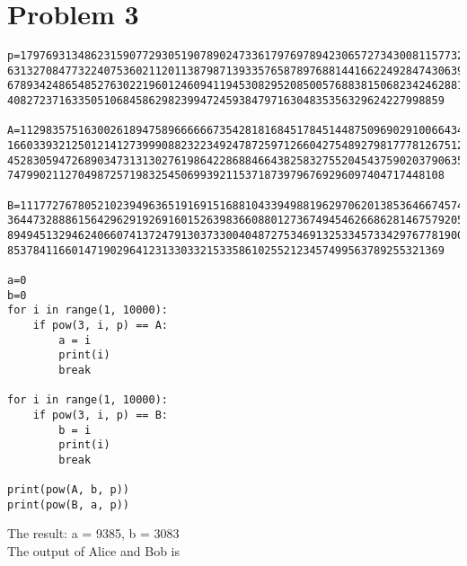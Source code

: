 \documentclass{article}
\begin{document}
\section{Problem 3}
\begin{lstlisting}
p=1797693134862315907729305190789024733617976978942306572734300811577326758055009
631327084773224075360211201138798713933576587897688144166224928474306394741243777
678934248654852763022196012460941194530829520850057688381506823424628814739131105
40827237163350510684586298239947245938479716304835356329624227998859

A=1129835751630026189475896666667354281816845178451448750969029100664347239526230
166033932125012141273999088232234924787259712660427548927981777812675128216074705
452830594726890347313130276198642286884664382583275520454375902037906355067286037
74799021127049872571983254506993921153718739796769296097404717448108

B=1117727678052102394963651916915168810433949881962970620138536466745747434010427
364473288861564296291926916015263983660880127367494546266862814675792056750844619
894945132946240660741372479130373300404872753469132533457334297677819009771026871
85378411660147190296412313303321533586102552123457499563789255321369

a=0
b=0
for i in range(1, 10000):
    if pow(3, i, p) == A:
        a = i
        print(i)
        break

for i in range(1, 10000):
    if pow(3, i, p) == B:
        b = i
        print(i)
        break

print(pow(A, b, p))
print(pow(B, a, p))
\end{lstlisting}
The result: a = 9385, b = 3083\\
The output of Alice and Bob is \\
\\ \hspace*{\fill} \\
\newpage
\end{document}
